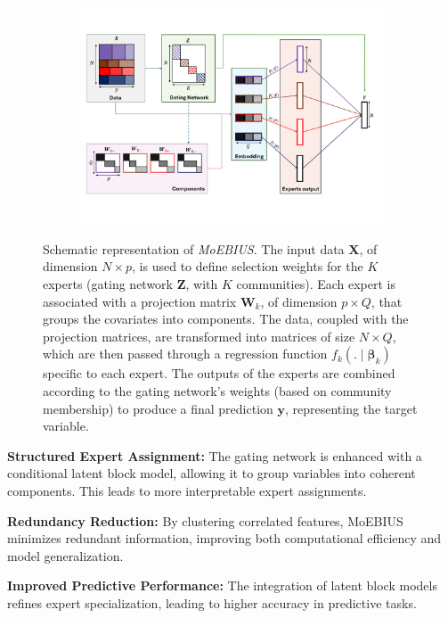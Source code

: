 \documentclass[authoryear,preprint,review,12pt]{elsarticle}
\DeclareMathOperator{\1}{\mathds{1}}
\newcommand{\bX}{\mathbf{X}}
\newcommand{\bZ}{\mathbf{Z}}
\newcommand{\bW}{\mathbf{W}}
\newcommand{\by}{\mathbf{y}}
\newcommand{\bbeta}{\boldsymbol{\beta}}
\begin{document}
\begin{frontmatter}
\begin{graphicalabstract}
\begin{figure}[!ht]
     \centering
     \begin{subfigure}[b]{\textwidth}
         \centering
         \includegraphics[width=\textwidth]{Figures/CocoLBMoE.png}
     \end{subfigure}
     \hfill
     \caption{ Schematic representation of \textit{MoEBIUS}.
     The input data \( \bX \), of dimension \( N \times p \), is used to define selection weights for the $K$ experts (gating network $\bZ$, with $K$ communities).
     Each expert is associated with a projection matrix \( \bW_k \), of dimension \( p \times Q \), that groups the covariates into components. The data, coupled with the projection matrices, are transformed into matrices of size \( N \times Q \), which are then passed through a regression function \( f_k(. \mid \bbeta_k) \) specific to each expert. 
     The outputs of the experts are combined according to the gating network's weights (based on community membership) to produce a final prediction \( \by \), representing the target variable.}
     \label{fig: CocoLBMoE}
\end{figure}
\end{graphicalabstract}

\begin{highlights}
    \item \textbf{Structured Expert Assignment:} The gating network is enhanced with a conditional latent block model, allowing it to group variables into coherent components. This leads to more interpretable expert assignments.
    \item \textbf{Redundancy Reduction:} By clustering correlated features, MoEBIUS minimizes redundant information, improving both computational efficiency and model generalization.
    \item \textbf{Improved Predictive Performance:} The integration of latent block models refines expert specialization, leading to higher accuracy in predictive tasks.
\end{highlights}


\end{frontmatter}
\end{document}
